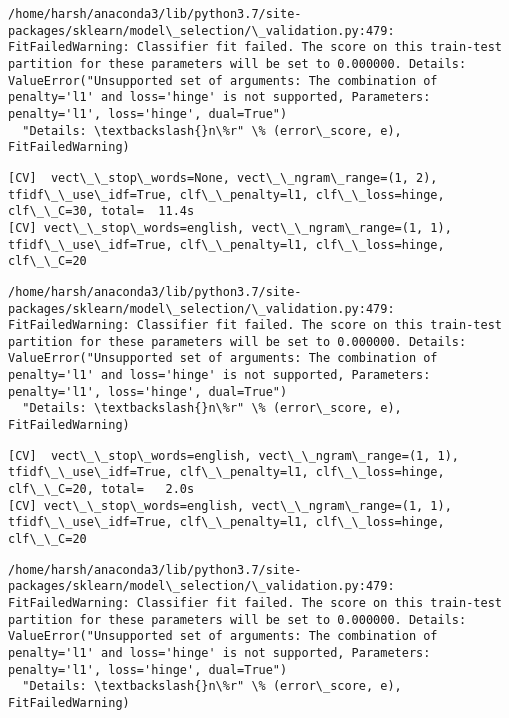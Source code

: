\documentclass[11pt]{article}
\begin{document}
    \begin{Verbatim}[commandchars=\\\{\}]
/home/harsh/anaconda3/lib/python3.7/site-packages/sklearn/model\_selection/\_validation.py:479: FitFailedWarning: Classifier fit failed. The score on this train-test partition for these parameters will be set to 0.000000. Details: 
ValueError("Unsupported set of arguments: The combination of penalty='l1' and loss='hinge' is not supported, Parameters: penalty='l1', loss='hinge', dual=True")
  "Details: \textbackslash{}n\%r" \% (error\_score, e), FitFailedWarning)

    \end{Verbatim}

    \begin{Verbatim}[commandchars=\\\{\}]
[CV]  vect\_\_stop\_words=None, vect\_\_ngram\_range=(1, 2), tfidf\_\_use\_idf=True, clf\_\_penalty=l1, clf\_\_loss=hinge, clf\_\_C=30, total=  11.4s
[CV] vect\_\_stop\_words=english, vect\_\_ngram\_range=(1, 1), tfidf\_\_use\_idf=True, clf\_\_penalty=l1, clf\_\_loss=hinge, clf\_\_C=20 

    \end{Verbatim}

    \begin{Verbatim}[commandchars=\\\{\}]
/home/harsh/anaconda3/lib/python3.7/site-packages/sklearn/model\_selection/\_validation.py:479: FitFailedWarning: Classifier fit failed. The score on this train-test partition for these parameters will be set to 0.000000. Details: 
ValueError("Unsupported set of arguments: The combination of penalty='l1' and loss='hinge' is not supported, Parameters: penalty='l1', loss='hinge', dual=True")
  "Details: \textbackslash{}n\%r" \% (error\_score, e), FitFailedWarning)

    \end{Verbatim}

    \begin{Verbatim}[commandchars=\\\{\}]
[CV]  vect\_\_stop\_words=english, vect\_\_ngram\_range=(1, 1), tfidf\_\_use\_idf=True, clf\_\_penalty=l1, clf\_\_loss=hinge, clf\_\_C=20, total=   2.0s
[CV] vect\_\_stop\_words=english, vect\_\_ngram\_range=(1, 1), tfidf\_\_use\_idf=True, clf\_\_penalty=l1, clf\_\_loss=hinge, clf\_\_C=20 

    \end{Verbatim}

    \begin{Verbatim}[commandchars=\\\{\}]
/home/harsh/anaconda3/lib/python3.7/site-packages/sklearn/model\_selection/\_validation.py:479: FitFailedWarning: Classifier fit failed. The score on this train-test partition for these parameters will be set to 0.000000. Details: 
ValueError("Unsupported set of arguments: The combination of penalty='l1' and loss='hinge' is not supported, Parameters: penalty='l1', loss='hinge', dual=True")
  "Details: \textbackslash{}n\%r" \% (error\_score, e), FitFailedWarning)

    \end{Verbatim}
\end{document}
